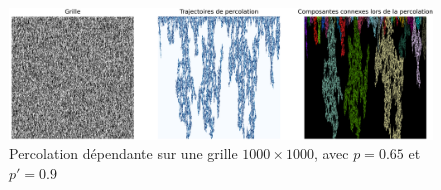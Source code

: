 \documentclass[11pt,a4paper]{article}
\begin{document}
\begin{figure}[htp]
    \centering
    \includegraphics[width=1 \textwidth]{./Pictures/fissure.png}
    \caption{Percolation dépendante sur une grille $1000\times 1000$, avec $p=0.65$ et $p'=0.9$}
    \label{fig:fissure}
\end{figure}

\newpage

\printbibliography[heading=bibintoc, title={Références}]
\end{document}
